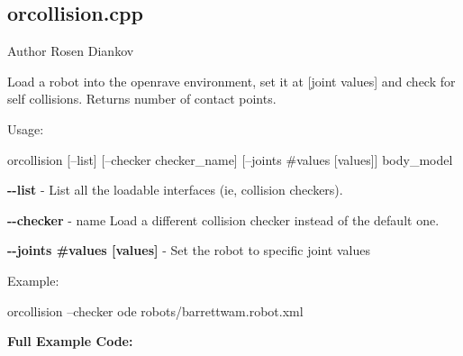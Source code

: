\hypertarget{orcollision.cpp-example}{
\subsection{orcollision.cpp}
}
\begin{DoxyAuthor}{Author}
Rosen Diankov
\end{DoxyAuthor}
Load a robot into the openrave environment, set it at \mbox{[}joint values\mbox{]} and check for self collisions. Returns number of contact points.

Usage: \begin{DoxyVerb}
    orcollision [--list] [--checker checker_name] [--joints #values [values]] body_model
    \end{DoxyVerb}



\begin{DoxyItemize}
\item {\bfseries -\/-\/list} -\/ List all the loadable interfaces (ie, collision checkers).
\item {\bfseries -\/-\/checker} -\/ name Load a different collision checker instead of the default one.
\item {\bfseries -\/-\/joints \#values \mbox{[}values\mbox{]}} -\/ Set the robot to specific joint values
\end{DoxyItemize}

Example: \begin{DoxyVerb}
    orcollision --checker ode robots/barrettwam.robot.xml
    \end{DoxyVerb}


{\bfseries Full Example Code:}



